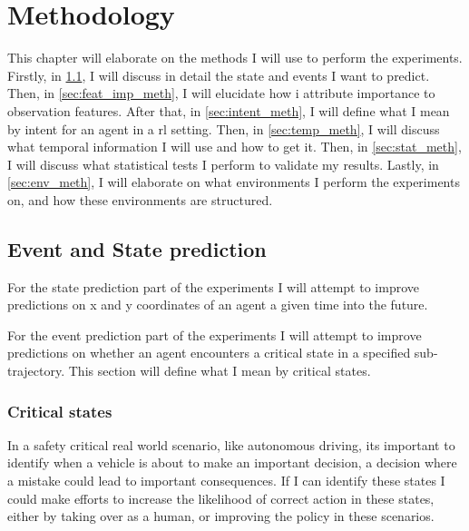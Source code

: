 \documentclass[UKenglish]{uiomasterthesis}
\begin{document}
\chapter{Methodology}
\label{chap:meth}
This chapter will elaborate on the methods I will use to perform the experiments. Firstly, in \cref{sec:event_state_meth}, I will discuss in detail the state and events I want to predict. Then, in \cref{sec:feat_imp_meth}, I will elucidate how i attribute importance to observation features. After that, in \cref{sec:intent_meth}, I will define what I mean by intent for an agent in a \ac{rl} setting. Then, in \cref{sec:temp_meth}, I will discuss what temporal information I will use and how to get it. Then, in \cref{sec:stat_meth}, I will discuss what statistical tests I perform to validate my results. Lastly, in \cref{sec:env_meth}, I will elaborate on what environments I perform the experiments on, and how these environments are structured.


\section{Event and State prediction}
\label{sec:event_state_meth}
For the state prediction part of the experiments I will attempt to improve predictions on x and y coordinates of an agent a given time into the future. 

For the event prediction part of the experiments I will attempt to improve predictions on whether an agent encounters a critical state in a specified sub-trajectory. This section will define what I mean by critical states.

\subsection{Critical states}
In a safety critical real world scenario, like autonomous driving, its important to identify when a vehicle is about to make an important decision, a decision where a mistake could lead to important consequences. If I can identify these states I could make efforts to increase the likelihood of correct action in these states, either by taking over as a human, or improving the policy in these scenarios.
\end{document}
